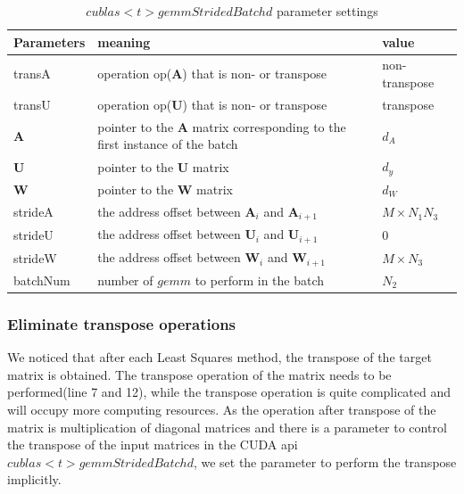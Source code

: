 \documentclass[journal,article,submit,moreauthors,pdftex,10pt,a4paper]{Definitions/mdpi}
\theoremstyle{plain}
\theoremstyle{definition}
\theoremstyle{remark}
\begin{document}
\begin{table}
\caption{$cublas<t>gemmStridedBatchd$ parameter settings}
\label{tab:gemm}
\begin{tabular}{|l|l|l|}
\hline
Parameters & meaning & value \\
\hline
transA & operation op($\mathbf{A}$) that is non- or transpose & non-transpose \\
\hline
transU & operation op($\mathbf{U}$) that is non- or transpose & transpose \\
\hline
$\mathbf{A}$ & pointer to the $\mathbf{A}$ matrix corresponding to the first instance of the batch & $d_A$ \\
\hline
$\mathbf{U}$ & pointer to the $\mathbf{U}$ matrix & $d_y$ \\
\hline
$\mathbf{W}$ & pointer to the $\mathbf{W}$ matrix & $d_W$ \\
\hline
strideA & the address offset between $\mathbf{A}_i$ and $\mathbf{A}_{i+1}$ & $M\times N_1N_3$ \\
\hline
strideU & the address offset between $\mathbf{U}_i$ and $\mathbf{U}_{i+1}$ & 0 \\
\hline
strideW & the address offset between $\mathbf{W}_i$ and $\mathbf{W}_{i+1}$ & $M\times N_3$ \\
\hline
batchNum & number of $gemm$ to perform in the batch & $N_2$ \\
\hline
\end{tabular}
\end{table}

\subsubsection{Eliminate transpose operations}
We noticed that after each Least Squares method, the transpose of the target matrix is obtained. The transpose operation of the matrix needs to be performed(line 7 and 12), while the transpose operation is quite complicated and will occupy more computing resources.
As the operation after transpose of the matrix is multiplication of diagonal matrices and there is a parameter to control the transpose of the input matrices in the CUDA api $cublas<t>gemmStridedBatchd$, we set the parameter to perform the transpose implicitly.
\end{document}
